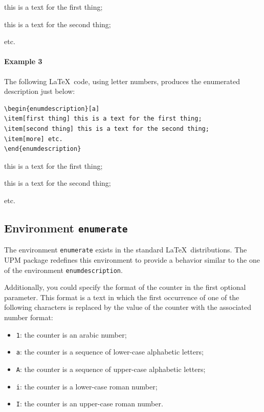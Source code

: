 \documentclass[book,taskpackage,specpackage,codepackage]{upmethodology-document}
\begin{document}
\begin{enumdescription}[1]
\item[first thing] this is a text for the first thing;
\item[second thing] this is a text for the second thing;
\item[more] etc.
\end{enumdescription}

\paragraph{Example 3} The following \LaTeX~code, using letter numbers, produces the enumerated description just below:
\begin{verbatim}
\begin{enumdescription}[a]
\item[first thing] this is a text for the first thing;
\item[second thing] this is a text for the second thing;
\item[more] etc.
\end{enumdescription}
\end{verbatim}

\begin{enumdescription}[a]
\item[first thing] this is a text for the first thing;
\item[second thing] this is a text for the second thing;
\item[more] etc.
\end{enumdescription}

\subsection{Environment \texttt{enumerate}}

The environment \texttt{enumerate} exists in the standard \LaTeX\ distributions.
The UPM package redefines this environment to provide a behavior similar to the one of the environment \texttt{enumdescription}.

Additionally, you could specify the format of the counter in the first optional parameter. This format is a text in which the first occurrence of one of the following characters is replaced by the value of the counter with the associated number format:
\begin{itemize}
\item \texttt{1}: the counter is an arabic number;
\item \texttt{a}: the counter is a sequence of lower-case alphabetic letters;
\item \texttt{A}: the counter is a sequence of upper-case alphabetic letters;
\item \texttt{i}: the counter is a lower-case roman number;
\item \texttt{I}: the counter is an upper-case roman number.
\end{itemize}
\end{document}
